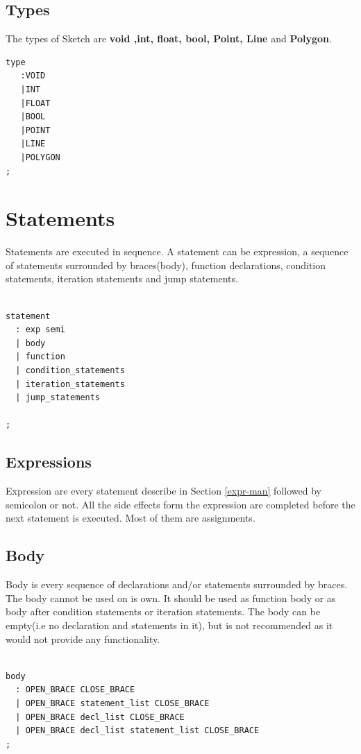 \documentclass{l3proj}
\begin{document}
\subsection{Types}
\label{types_man}
The types of Sketch are \textbf{void ,int, float, bool, Point, Line} and \textbf{Polygon}.
\begin{lstlisting}
type
   :VOID 
   |INT
   |FLOAT 
   |BOOL
   |POINT
   |LINE
   |POLYGON
;

\end{lstlisting}
\section {Statements}
Statements are executed in sequence. A statement can be expression, a sequence of statements surrounded by braces(body), function declarations, condition statements, iteration statements and jump statements.

\begin{lstlisting}

statement
  : exp semi
  | body
  | function
  | condition_statements
  | iteration_statements
  | jump_statements

;

\end{lstlisting}

\subsection{Expressions} 
Expression are every statement describe in Section \ref{expr-man} followed by semicolon or not. All the side effects form the expression are completed before the next statement is executed. Most of them are assignments. 

\subsection{Body}
\label{body}
Body is every sequence of declarations and/or statements surrounded by braces. The body cannot be used on is own. It should be used as  function body or as body after condition statements or iteration statements. The body can be empty(i.e no declaration and statements in it), but is not recommended as it would not provide any functionality. 
\begin{lstlisting}

body
  : OPEN_BRACE CLOSE_BRACE
  | OPEN_BRACE statement_list CLOSE_BRACE
  | OPEN_BRACE decl_list CLOSE_BRACE
  | OPEN_BRACE decl_list statement_list CLOSE_BRACE
;


\end{lstlisting}
\end{document}
